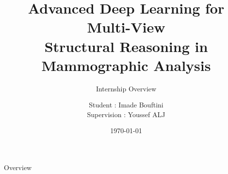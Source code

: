 \documentclass[8pt,aspectratio=169,xcolor=dvipsnames]{beamer}
\title{Advanced Deep Learning for Multi-View \\Structural Reasoning in Mammographic Analysis}
\subtitle{Internship Overview}
\author{Student : Imade Bouftini
\\Supervision : Youssef ALJ}
\date{\today} %
\begin{document}
\begin{frame}
    \titlepage
\end{frame}
\usebackgroundtemplate{}

\begin{frame}{Overview}
    \tableofcontents
\end{frame}
\end{document}
